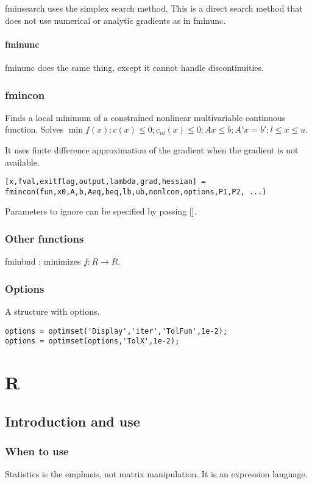 fminsearch uses the simplex search method. This is a direct search method that does not use numerical or analytic gradients as in fminunc.

\subsubsection{fminunc}
fminunc does the same thing, except it cannot handle discontinuities. \chk

\subsection{fmincon}
Finds a local minimum of a constrained nonlinear multivariable continuous function. Solves $\min f(x): c(x) \leq 0; c_{nl}(x) \leq 0; Ax \leq b; A'x = b'; l \leq x \leq u$.

It uses finite difference approximation of the gradient when the gradient is not available.

\begin{lstlisting}
[x,fval,exitflag,output,lambda,grad,hessian] = fmincon(fun,x0,A,b,Aeq,beq,lb,ub,nonlcon,options,P1,P2, ...)
\end{lstlisting}

Parameters to ignore can be specified by passing [].

\subsection{Other functions}
fminbnd : minimizes $f:R \to R$.

\subsection{Options}
A structure with options.

\begin{lstlisting}
options = optimset('Display','iter','TolFun',1e-2);
options = optimset(options,'TolX',1e-2);
\end{lstlisting}


\chapter{R}
\section{Introduction and use}
\subsection{When to use}
Statistics is the emphasis, not matrix manipulation. It is an expression language.

